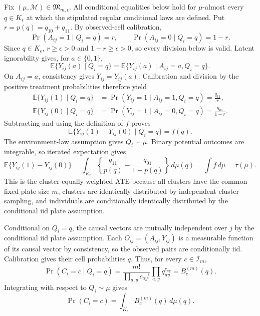 Fix \((\mu,\mathcal M)\in\mathfrak M_{m,\epsilon}\).  All conditional equalities below hold for \(\mu\)-almost every \(q\in K_{\epsilon}\) at which the stipulated regular conditional laws are defined.  Put \(r=p(q)=q_{10}+q_{11}\).  By observed-cell calibration,
\[
 \Pr(A_{ij}=1\mid Q_i=q)=r,
 \qquad
 \Pr(A_{ij}=0\mid Q_i=q)=1-r.
\]
Since \(q\in K_{\epsilon}\), \(r\geq\epsilon>0\) and \(1-r\geq\epsilon>0\), so every division below is valid.  Latent ignorability gives, for \(a\in\{0,1\}\),
\[
 \mathbb E\{Y_{ij}(a)\mid Q_i=q\}
 =\mathbb E\{Y_{ij}(a)\mid A_{ij}=a,Q_i=q\}.
\]
On \(A_{ij}=a\), consistency gives \(Y_{ij}=Y_{ij}(a)\).  Calibration and division by the positive treatment probabilities therefore yield
\[
 \begin{aligned}
 \mathbb E\{Y_{ij}(1)\mid Q_i=q\}
 &=\Pr(Y_{ij}=1\mid A_{ij}=1,Q_i=q)=\frac{q_{11}}r,\\
 \mathbb E\{Y_{ij}(0)\mid Q_i=q\}
 &=\Pr(Y_{ij}=1\mid A_{ij}=0,Q_i=q)=\frac{q_{01}}{1-r}.
 \end{aligned}
\]
Subtracting and using the definition of \(f\) proves
\[
 \mathbb E\{Y_{ij}(1)-Y_{ij}(0)\mid Q_i=q\}=f(q).
\]
The environment-law assumption gives \(Q_i\sim\mu\).  Binary potential outcomes are integrable, so iterated expectation gives
\[
 \mathbb E\{Y_{ij}(1)-Y_{ij}(0)\}
 =\int_{K_{\epsilon}}\left\{\frac{q_{11}}{p(q)}-\frac{q_{01}}{1-p(q)}\right\}\,d\mu(q)
 =\int f\,d\mu=\tau(\mu).
\]
This is the cluster-equally-weighted ATE because all clusters have the common fixed plate size \(m\), clusters are identically distributed by independent cluster sampling, and individuals are conditionally identically distributed by the conditional iid plate assumption.

Conditional on \(Q_i=q\), the causal vectors are mutually independent over \(j\) by the conditional iid plate assumption.  Each \(O_{ij}=(A_{ij},Y_{ij})\) is a measurable function of its causal vector by consistency, so the observed pairs are conditionally iid.  Calibration gives their cell probabilities \(q\).  Thus, for every \(c\in\mathcal I_m\),
\[
 \Pr(C_i=c\mid Q_i=q)
 =\frac{m!}{\prod_{a,y}c_{ay}!}\prod_{a,y}q_{ay}^{c_{ay}}
 =B_c^{(m)}(q).
\]
Integrating with respect to \(Q_i\sim\mu\) gives
\[
 \Pr(C_i=c)=\int_{K_{\epsilon}}B_c^{(m)}(q)\,d\mu(q).
\]

